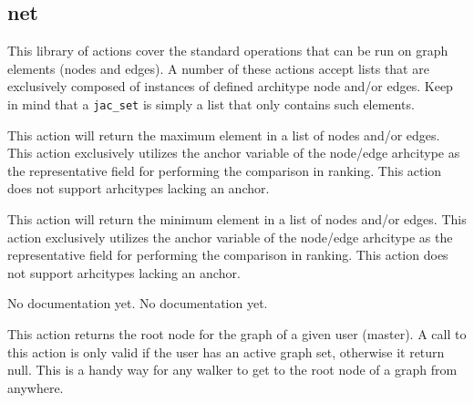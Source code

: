 \subsection{net}
\par
This library of actions cover the standard operations that can be
run on graph elements (nodes and edges). A number of these actions
accept lists that are exclusively composed of instances of defined
architype node and/or edges. Keep in mind that a \lstinline{jac_set}
is simply a list that only contains such elements.
{This action will return the maximum element in a list of nodes
and/or edges. This action exclusively utilizes the anchor variable
of the node/edge arhcitype as the representative field for
performing the  comparison in ranking. This action does not support
arhcitypes lacking an anchor.\vspace{4mm}\par
{}\vspace{4mm}\par
{}}
{This action will return the minimum element in a list of nodes
and/or edges. This action exclusively utilizes the anchor variable
of the node/edge arhcitype as the representative field for
performing the  comparison in ranking. This action does not support
arhcitypes lacking an anchor.\vspace{4mm}\par
{}\vspace{4mm}\par
{}}
{No documentation yet.}
{No documentation yet.}
{This action returns the root node for the graph of a given user (master). A call
to this action is only valid if the user has an active graph set, otherwise it
return null. This is a handy way for any walker to get to the root node of a
graph from anywhere.\vspace{4mm}\par
{}}
